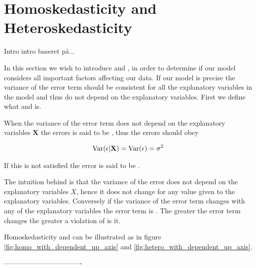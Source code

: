 \newpage
\section{Homoskedasticity and Heteroskedasticity}
Intro intro baseret på...

In this section we wish to introduce \homo and \hetero, in order to determine if our model considers all important factors affecting our data. If our model is precise the variance of the error term should be consistent for all the explanatory variables in the model and thus do not depend on the explanatory variables. First we define what \homo and \hetero is. 

\begin{definition}
When the variance of the error term does not depend on the explanatory variables $\textbf{X}$ the errors is said to be \homo, thus the errors should obey

\begin{align*}
    \operatorname{\text{Var}}(\epsilon | \textbf{X}) = \operatorname{\text{Var}}(\epsilon) = \sigma^2
\end{align*}

If this is not satisfied the error is said to be \hetero. 

\end{definition}

The intuition behind \homo is that the variance of the error does not depend on the explanatory variables $X$, hence it does not change for any value given to the explanatory variables. Conversely if the variance of the error term changes with any of the explanatory variables the error term is \hetero. The greater the error term changes the greater a violation of \homo is it. 


Homoskedasticity and \hetero can be illustrated as in figure \ref{fig:homo_with_dependent_up_axis} and \ref{fig:hetero_with_dependent_up_axis}. 




----------------------------------


